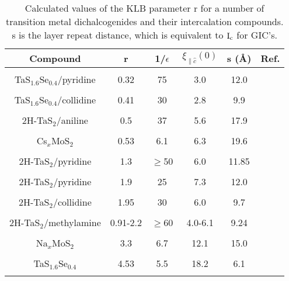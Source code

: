 \pagestyle{empty}

\begin{table}
\caption[Calculated values of the KLB parameter r for a number of
transition    metal      dichalcogenides    and       their   intercalation
compounds.]{Calculated values  of the   KLB  parameter r   for a  number of
transition metal  dichalcogenides  and their intercalation compounds.  s is
the layer repeat distance, which is equivalent to $\rm I_c$ for GIC's.}
\label{klbtable}
\begin{center}
\begin{tabular}{|c|ccccc|}
\hline
Compound & r & 1/$\epsilon$ & $\xi_{\parallel \hat{c}}(0)$ & s (\AA) & Ref.\\
\hline
& & & & & \\
TaS$_{1.6}$Se$_{0.4}$/pyridine & 0.32& 75& 3.0 & 12.0  & \cite{prober80}\\
& & & & & \\
TaS$_{1.6}$Se$_{0.4}$/collidine & 0.41& 30& 2.8 & 9.9 & \cite{prober80}\\
& & & & & \\
2H-TaS$_2$/aniline & 0.5& 37  & 5.6& 17.9 & \cite{prober80}\\
& & & & & \\
Cs$ _x$MoS$_2$ & 0.53 & 6.1 & 6.3 & 19.6 & \cite{woollam76,somoano73}\\
& & & & & \\
2H-TaS$_2$/pyridine & 1.3& $\geq$50 & 6.0 & 11.85 & \cite{coleman83}\\
& & & & & \\
2H-TaS$_2$/pyridine & 1.9& 25 & 7.3 & 12.0 & \cite{prober80}\\
& & & & & \\
2H-TaS$_2$/collidine & 1.95& 30& 6.0 & 9.7 & \cite{prober80}\\
& & & & & \\
2H-TaS$_2$/methylamine &0.91-2.2 & $\geq$60 & 4.0-6.1 & 9.24 & \cite{coleman83}\\
& & & & & \\
Na$ _x$MoS$_2$ & 3.3 & 6.7 & 12.1 & 15.0 & \cite{woollam76,somoano75}\\
& & & & & \\
TaS$_{1.6}$Se$_{0.4}$ & 4.53& 5.5& 18.2& 6.1  & \cite{prober80}\\
& & & & & \\

\end{tabular}
\end{center}
\end{table}
